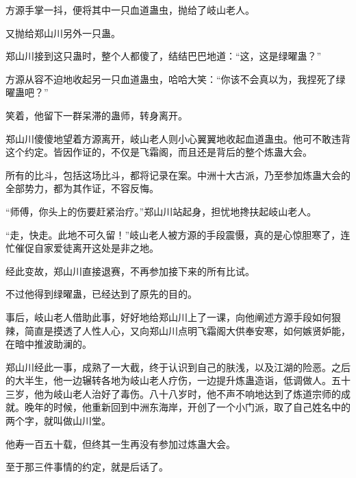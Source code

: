 \begin{this_body}
方源手掌一抖，便将其中一只血道蛊虫，抛给了岐山老人。

又抛给郑山川另外一只蛊。

郑山川接到这只蛊时，整个人都傻了，结结巴巴地道：“这，这是绿曜蛊？”

方源从容不迫地收起另一只血道蛊虫，哈哈大笑：“你该不会真以为，我捏死了绿曜蛊吧？”

笑着，他留下一群呆滞的蛊师，转身离开。

郑山川傻傻地望着方源离开，岐山老人则小心翼翼地收起血道蛊虫。他可不敢违背这个约定。皆因作证的，不仅是飞霜阁，而且还是背后的整个炼蛊大会。

所有的比斗，包括这场比斗，都将记录在案。中洲十大古派，乃至参加炼蛊大会的全部势力，都为其作证，不容反悔。

“师傅，你头上的伤要赶紧治疗。”郑山川站起身，担忧地搀扶起岐山老人。

“走，快走。此地不可久留！”岐山老人被方源的手段震慑，真的是心惊胆寒了，连忙催促自家爱徒离开这处是非之地。

经此变故，郑山川直接退赛，不再参加接下来的所有比试。

不过他得到绿曜蛊，已经达到了原先的目的。

事后，岐山老人借助此事，好好地给郑山川上了一课，向他阐述方源手段如何狠辣，简直是摸透了人性人心，又向郑山川点明飞霜阁大供奉安寒，如何嫉贤妒能，在暗中推波助澜的。

郑山川经此一事，成熟了一大截，终于认识到自己的肤浅，以及江湖的险恶。之后的大半生，他一边辗转各地为岐山老人疗伤，一边提升炼蛊造诣，低调做人。五十三岁，他为岐山老人治好了毒伤。八十八岁时，他不声不响地达到了炼道宗师的成就。晚年的时候，他重新回到中洲东海岸，开创了一个小门派，取了自己姓名中的两个字，就叫做山川堂。

他寿一百五十载，但终其一生再没有参加过炼蛊大会。

至于那三件事情的约定，就是后话了。

\end{this_body}

